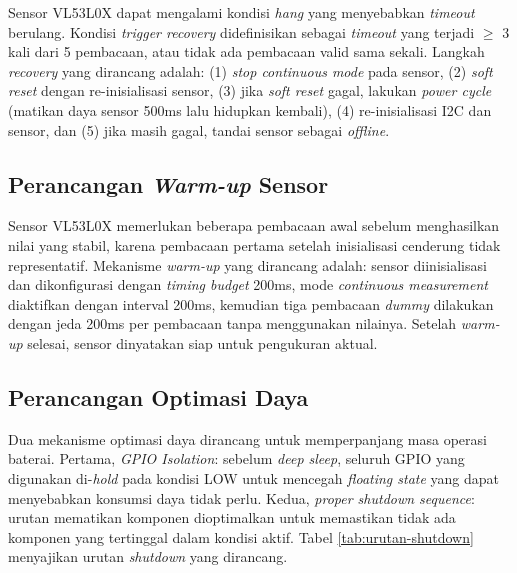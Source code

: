 Sensor VL53L0X dapat mengalami kondisi \textit{hang} yang menyebabkan \textit{timeout} berulang. Kondisi \textit{trigger recovery} didefinisikan sebagai \textit{timeout} yang terjadi $\geq$ 3 kali dari 5 pembacaan, atau tidak ada pembacaan valid sama sekali. Langkah \textit{recovery} yang dirancang adalah: (1) \textit{stop continuous mode} pada sensor, (2) \textit{soft reset} dengan re-inisialisasi sensor, (3) jika \textit{soft reset} gagal, lakukan \textit{power cycle} (matikan daya sensor 500ms lalu hidupkan kembali), (4) re-inisialisasi I2C dan sensor, dan (5) jika masih gagal, tandai sensor sebagai \textit{offline}.

\subsection{Perancangan \textit{Warm-up} Sensor}

Sensor VL53L0X memerlukan beberapa pembacaan awal sebelum menghasilkan nilai yang stabil, karena pembacaan pertama setelah inisialisasi cenderung tidak representatif. Mekanisme \textit{warm-up} yang dirancang adalah: sensor diinisialisasi dan dikonfigurasi dengan \textit{timing budget} 200ms, mode \textit{continuous measurement} diaktifkan dengan interval 200ms, kemudian tiga pembacaan \textit{dummy} dilakukan dengan jeda 200ms per pembacaan tanpa menggunakan nilainya. Setelah \textit{warm-up} selesai, sensor dinyatakan siap untuk pengukuran aktual.

\subsection{Perancangan Optimasi Daya}

Dua mekanisme optimasi daya dirancang untuk memperpanjang masa operasi baterai. Pertama, \textit{GPIO Isolation}: sebelum \textit{deep sleep}, seluruh GPIO yang digunakan di-\textit{hold} pada kondisi LOW untuk mencegah \textit{floating state} yang dapat menyebabkan konsumsi daya tidak perlu. Kedua, \textit{proper shutdown sequence}: urutan mematikan komponen dioptimalkan untuk memastikan tidak ada komponen yang tertinggal dalam kondisi aktif. Tabel \ref{tab:urutan-shutdown} menyajikan urutan \textit{shutdown} yang dirancang.

